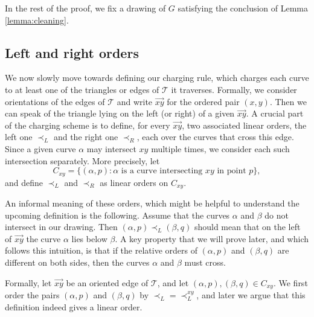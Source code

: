 \documentclass[11pt]{amsart}
\theoremstyle{definition}
\newcommand{\cT}{\mathcal{T}}
\begin{document}
In the rest of the proof, we fix a drawing of $G$ satisfying the conclusion of Lemma \ref{lemma:cleaning}. 


\subsection{Left and right orders}
We now slowly move towards defining our charging rule, which charges each curve to at least one of the triangles or edges of $\cT$ it traverses.
Formally, we consider orientations of the edges of $\cT$ and write $\vec{xy}$ for the ordered pair $(x, y)$.
Then we can speak of the triangle lying on the left (or right) of a given $\vec{xy}$.
A crucial part of the charging scheme is to define, for every $\vec{xy}$, two associated linear orders, the left one $\prec_L$ and the right one $\prec_R$, each over the curves that cross this edge.
Since a given curve $\alpha$ may intersect $xy$ multiple times, we consider each such intersection separately.
More precisely, let
$$C_{xy}=\{(\alpha,p):\alpha\text{ is a curve intersecting }xy\text{ in point }p\},$$
and define $\prec_L$ and $\prec_R$ as linear orders on $C_{xy}$.

An informal meaning of these orders, which might be helpful to understand the upcoming definition is the following.
Assume that the curves $\alpha$ and $\beta$ do not intersect in our drawing.
Then $(\alpha, p) \prec_L (\beta, q)$ should mean that on the left of $\vec{xy}$ the curve $\alpha$ lies below $\beta$.
A key property that we will prove later, and which follows this intuition, is that if the relative orders of $(\alpha, p)$ and $ (\beta, q)$ are different on both sides, then the curves $\alpha$ and $\beta$ must cross.

\medskip

Formally, let $\vec{xy}$ be an oriented edge of $\cT$, and let $(\alpha,p),(\beta,q)\in C_{xy}$. We first order the pairs $(\alpha,p)$ and $(\beta,q)$ by $\prec_L=\prec_L^{xy}$, and later we argue that this definition indeed gives a linear order.
\end{document}
